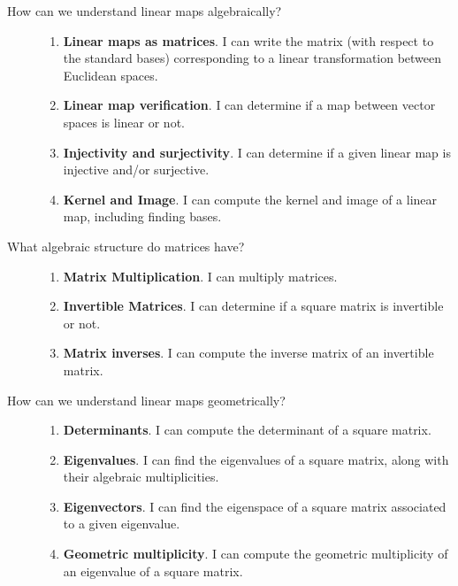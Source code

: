 \begin{description}
\item[How can we understand linear maps algebraically?] \hfill
\begin{enumerate}
\item {\bf Linear maps as matrices}.  I can write the matrix (with respect to the standard bases) corresponding to a linear transformation between Euclidean spaces.
\item {\bf Linear map verification}. I can determine if a map between vector spaces is linear or not.
\item {\bf Injectivity and surjectivity}.  I can determine if a given linear map is injective and/or surjective.
\item {\bf Kernel and Image}. I can compute the kernel and image of a linear map, including finding bases.
\end{enumerate}


\item[What algebraic structure do matrices have?] \hfill
\begin{enumerate}
\item {\bf Matrix Multiplication}. I can multiply matrices.
\item {\bf Invertible Matrices}. I can determine if a square matrix is invertible or not.
\item {\bf Matrix inverses}.  I can compute the inverse matrix of an invertible matrix.
\end{enumerate}


\item[How can we understand linear maps geometrically?] \hfill
\begin{enumerate}
\item {\bf Determinants}. I can compute the determinant of a square matrix.
\item {\bf Eigenvalues}. I can find the eigenvalues of a square matrix, along with their algebraic multiplicities.
\item {\bf Eigenvectors}. I can find the eigenspace of a square matrix associated to a given eigenvalue.
\item {\bf Geometric multiplicity}. I can compute the geometric multiplicity of an eigenvalue of a square matrix.
\end{enumerate}

\end{description}




